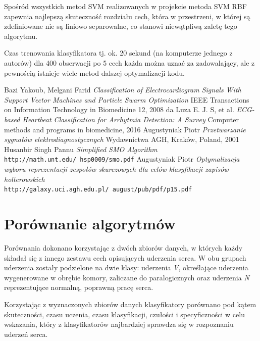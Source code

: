 \documentclass[[10pt,a4paper]{article}
\begin{document}
Spośród wszystkich metod SVM realizowanych w projekcie metoda SVM RBF zapewnia najlepszą skuteczność rozdziału cech, która w przestrzeni, w której są zdefiniowane nie są liniowo separowalne, co stanowi niewątpliwą zaletę tego algorytmu. \cite{melgani}

Czas trenowania klasyfikatora tj. ok. 20 sekund (na komputerze jednego z autorów) dla 400 obserwacji po 5 cech każda można uznać za zadowalający, ale z pewnością istnieje wiele metod dalszej optymalizacji kodu.

\begin{thebibliography}{9}
	
	Bazi Yakoub, Melgani Farid
	\textit{Classification of Electrocardiogram Signals With Support Vector Machines and Particle Swarm Optimization} 
	IEEE Transactions on Information Technology in Biomedicine 12, 2008
	da Luza E. J. S, et al.
	\textit{ECG-based Heartbeat Classification for Arrhytmia Detection: A Survey} 
	Computer methods and programs in biomedicine, 2016
	Augustyniak Piotr
	\textit{Przetwarzanie sygnałów elektrodiagnostycznych} 
	Wydawnictwa AGH, Kraków, Poland, 2001
	Husanbir Singh Pannu
	\textit{Simplified SMO Algorithm} 
	\\\texttt{http://math.unt.edu/~hsp0009/smo.pdf}
	Augustyniak Piotr
	\textit{Optymalizacja wyboru reprezentacji zespołów skurczowych dla celów klasyfikacji zapisów holterowskich} 
	\\\texttt{http://galaxy.uci.agh.edu.pl/~august/pub/pdf/p15.pdf}
	
\end{thebibliography}
\newpage
\section{Porównanie algorytmów}
Porównania dokonano korzystając z dwóch zbiorów danych, w których każdy składał się z innego zestawu cech opisujących uderzenia serca. W obu grupach uderzenia zostały podzielone na dwie klasy: uderzenia \textit{V}, określające uderzenia wygenerowane w obrębie komory, zaliczane do paralogicznych oraz uderzenia \textit{N} reprezentujące normalną, poprawną pracę serca. 

Korzystając z wyznaczonych zbiorów danych klasyfikatory porównano pod kątem skuteczności, czasu uczenia, czasu klasyfikacji, czułości i specyficzności w celu wskazania, który z klasyfikatorów najbardziej sprawdza się w rozpoznaniu uderzeń serca. 
\end{document}
